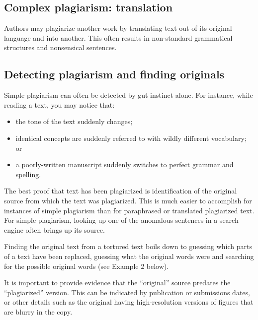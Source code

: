 \documentclass[letterpaper, 12pt]{article}
\begin{document}
\subsection*{Complex plagiarism: translation}

Authors may plagiarize another work by translating text out of its original language and into another. This often results in non-standard grammatical structures and nonsensical sentences.

\subsection*{Detecting plagiarism and finding originals}

Simple plagiarism can often be detected by gut instinct alone. For instance, while reading a text, you may notice that:

\begin{itemize}
    \setlength\itemsep{-0.5em}
    \item the tone of the text suddenly changes;
    \item identical concepts are suddenly referred to with wildly different vocabulary; or
    \item a poorly-written manuscript suddenly switches to perfect grammar and spelling.
\end{itemize}

The best proof that text has been plagiarized is identification of the original source from which the text was plagiarized. This is much easier to accomplish for instances of simple plagiarism than for paraphrased or translated plagiarized text. For simple plagiarism, looking up one of the anomalous sentences in a search engine often brings up its source.

Finding the original text from a tortured text boils down to guessing which parts of a text have been replaced, guessing what the original words were and searching for the possible original words (see Example 2 below).

It is important to provide evidence that the ``original'' source predates the ``plagiarized'' version. This can be indicated by publication or submissions dates, or other details such as the original having high-resolution versions of figures that are blurry in the copy.
\end{document}
